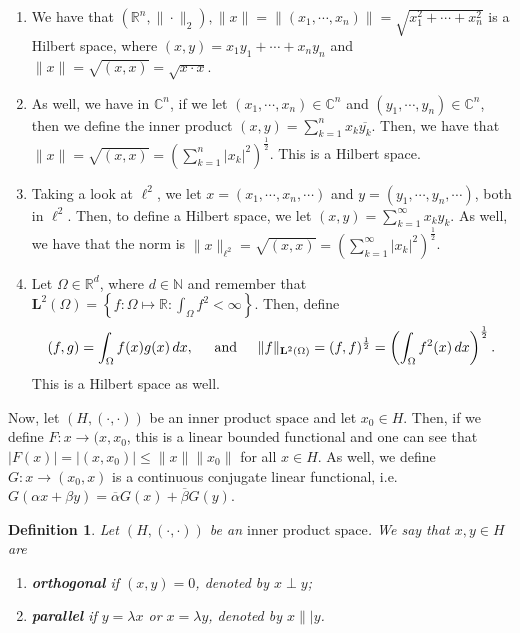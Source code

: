 \documentclass[12pt]{article}
\newtheorem{definition}{Definition}
\newcommand{\R}{{\mathbb R}}
\newcommand{\C}{{\mathbb C}}
\newcommand{\N}{{\mathbb N}}
\newcommand{\Om}{\Omega}
\newcommand{\dint}{\displaystyle\int}
\newcommand{\ov}{\overline}
\newcommand{\ml}{\mathbf{L}}
\newcommand{\inner}{(\cdot, \cdot)}
\newcommand{\ips}{\text{inner product space}}
\begin{document}
\begin{enumerate}[topsep=-15pt]
\item We have that $(\R^n, \| \cdot \|_{2}), \| x \| = \| (x_1, \cdots, x_n) \| = \sqrt{x_1^2 + \cdots + x_n^2}$ is a Hilbert space, where $(x, y) = x_1 y_1 + \cdots + x_n y_n$ and $\| x \| = \sqrt{(x, x)} = \sqrt{x \cdot x}$. 
\item As well, we have in $\C^n$, if we let $(x_1, \cdots, x_n) \in \C^n$ and $(y_1, \cdots, y_n) \in \C^n$, then we define the inner product $(x, y) = \sum\limits_{k =1}^n x_k \ov{y_k}$. Then, we have that $\| x \| = \sqrt{(x, x)} = \left( \sum\limits_{k =1}^n |x_k|^2\right)^{\frac{1}{2}}$. This is a Hilbert space.
\item Taking a look at $\ell^2$, we let $x = (x_1, \cdots, x_n , \cdots)$ and $y = (y_1, \cdots, y_n, \cdots)$, both in $\ell^2$. Then, to define a Hilbert space, we let $(x, y) = \sum\limits_{k =1}^{\infty} x_k y_k$. As well, we have that the norm is $\| x \|_{\ell^2} = \sqrt{(x, x)} = \left( \sum\limits_{k =1}^{\infty} |x_k|^2\right)^{\frac{1}{2}}$.
\item Let $\Om \in \R^d$, where $d \in \N$ and remember that $\ml^2(\Om) = \left\lbrace f: \Om \mapsto \R : \int_{\Om} f^2 < \infty \right\rbrace$. Then, define
\[(f, g) = \dint_{\Om} f(x) g(x) \, dx, \hspace{4mm} \text{ and } \hspace{4mm} \| f \|_{\ml^2(\Om)} = (f, f)^{\frac{1}{2}} = \left( \dint_{\Om} f^2(x) \, dx \right)^{\frac{1}{2}}. \]
This is a Hilbert space as well.
\end{enumerate}
Now, let $(H, \inner)$ be an $\ips$ and let $x_0 \in H$. Then, if we define $F: x \to (x, x_0$, this is a linear bounded functional and one can see that $|F(x)| = |(x, x_0)| \leq \| x \| \| x_0 \|$ for all $x \in H$. As well, we define $G: x \to (x_0, x)$ is a continuous conjugate linear functional, i.e. $G(\alpha x + \beta y) = \ov{\alpha} G(x) + \ov{\beta} G(y)$. 
\begin{definition}
Let $(H, \inner)$ be an $\ips$. We say that $x, y \in H$ are 
\begin{enumerate}[topsep=-15pt, itemsep=0pt]
\item \textbf{orthogonal} if $(x, y) = 0$, denoted by $x \perp y$;
\item \textbf{parallel} if $y = \lambda x$ or $x = \lambda y$, denoted by $x \|| y$.
\end{enumerate}
\end{definition}
\vspace{-25pt}
\end{document}

